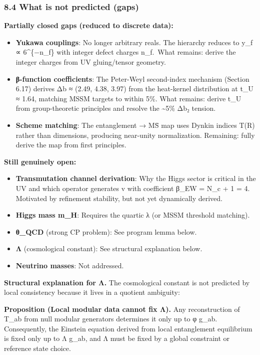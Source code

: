 \documentclass[
]{article}
\providecommand{\tightlist}{%
  \setlength{\itemsep}{0pt}\setlength{\parskip}{0pt}}
\begin{document}
\subsubsection{8.4 What is not predicted
(gaps)}\label{what-is-not-predicted-gaps}

\textbf{Partially closed gaps (reduced to discrete data):}

\begin{itemize}
\tightlist
\item
  \textbf{Yukawa couplings}: No longer arbitrary reals. The hierarchy
  reduces to y\_f ∝ 6\^{}\{−n\_f\} with integer defect charges
  n\_f.~What remains: derive the integer charges from UV gluing/tensor
  geometry.
\item
  \textbf{β-function coefficients}: The Peter-Weyl second-index
  mechanism (Section 6.17) derives Δb ≈ (2.49, 4.38, 3.97) from the
  heat-kernel distribution at t\_U ≈ 1.64, matching MSSM targets to
  within 5\%. What remains: derive t\_U from group-theoretic principles
  and resolve the \textasciitilde5\% Δb₂ tension.
\item
  \textbf{Scheme matching}: The entanglement → MS̄ map uses Dynkin
  indices T(R) rather than dimensions, producing near-unity
  normalization. Remaining: fully derive the map from first principles.
\end{itemize}

\textbf{Still genuinely open:}

\begin{itemize}
\tightlist
\item
  \textbf{Transmutation channel derivation}: Why the Higgs sector is
  critical in the UV and which operator generates v with coefficient
  β\_EW = N\_c + 1 = 4. Motivated by refinement stability, but not yet
  dynamically derived.
\item
  \textbf{Higgs mass m\_H}: Requires the quartic λ (or MSSM threshold
  matching).
\item
  \textbf{θ\_QCD} (strong CP problem): See program lemma below.
\item
  \textbf{Λ} (cosmological constant): See structural explanation below.
\item
  \textbf{Neutrino masses}: Not addressed.
\end{itemize}

\textbf{Structural explanation for Λ.} The cosmological constant is not
predicted by local consistency because it lives in a quotient ambiguity:

\textbf{Proposition (Local modular data cannot fix Λ).} Any
reconstruction of T\_ab from null modular generators determines it only
up to φ g\_ab. Consequently, the Einstein equation derived from local
entanglement equilibrium is fixed only up to Λ g\_ab, and Λ must be
fixed by a global constraint or reference state choice.
\end{document}
